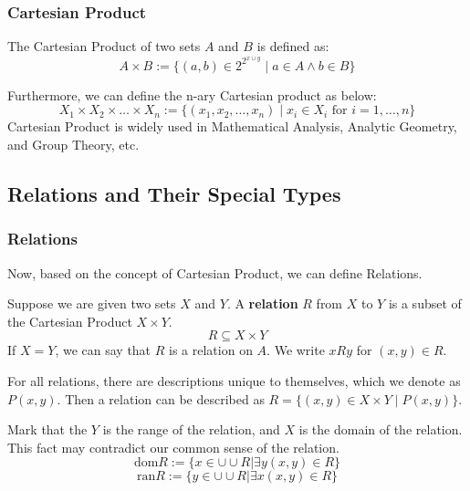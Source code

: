 \subsubsection{Cartesian Product}
\begin{definition}
The Cartesian Product of two sets $A$ and $B$ is defined as:
$$ A \times B := \{ (a,b) \in 2^{2^{x \cup y}} \mid a \in A \wedge b \in B \} $$
\end{definition}
Furthermore, we can define the n-ary Cartesian product as below:
$$ X_1 \times X_2 \times \dots \times X_n := \{ (x_1, x_2, \dots, x_n) \mid x_i \in X_i \text{ for } i=1, \dots, n \} $$
Cartesian Product is widely used in Mathematical Analysis, Analytic Geometry, and Group Theory, etc.

\subsection{Relations and Their Special Types}

\subsubsection{Relations}
Now, based on the concept of Cartesian Product, we can define Relations.
\begin{definition}[Relation]
Suppose we are given two sets $X$ and $Y$. A \textbf{relation} $R$ from $X$ to $Y$ is a subset of the Cartesian Product $X \times Y$.
$$ R \subseteq X \times Y $$
If $X=Y$, we can say that $R$ is a relation on $A$. We write $xRy$ for $(x,y) \in R$.
\end{definition}
For all relations, there are descriptions unique to themselves, which we denote as $P(x,y)$. Then a relation can be described as $R = \{ (x,y) \in X \times Y \mid P(x,y) \}$.

\begin{remark}
Mark that the $Y$ is the range of the relation, and $X$ is the domain of the relation. This fact may contradict our common sense of the relation.
\[
\text{dom}R:=\{x \in \cup \cup R| \exists y (x,y) \in R\}
\]
\[
\text{ran}R:=\{y\in \cup \cup R| \exists x(x,y) \in R\}
\]
\end{remark}

